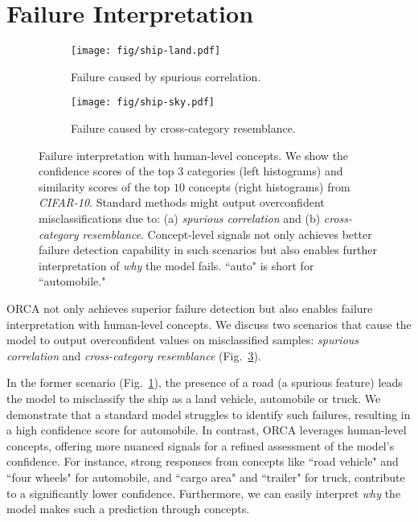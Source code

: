 \section{Failure Interpretation} \label{sec:interpretation}

\begin{figure}
    \centering
    \begin{subfigure}[b]{\linewidth}
         \centering
         \texttt{[image: fig/ship-land.pdf]}
         \caption{Failure caused by spurious correlation.}
         \label{viz:ship-land}
         \vspace{0.2cm}
     \end{subfigure}
    
     \begin{subfigure}[b]{\linewidth}
         \centering
         \texttt{[image: fig/ship-sky.pdf]}
         \caption{Failure caused by cross-category resemblance.}
         \label{viz:ship-sky}
     \end{subfigure}
    \caption{Failure interpretation with human-level concepts. We show the confidence scores of the top $3$ categories (left histograms) and similarity scores of the top $10$ concepts (right histograms) from \textit{CIFAR-10}. Standard methods might output overconfident misclassifications due to: (a) \textit{spurious correlation} and (b) \textit{cross-category resemblance}. Concept-level signals not only achieves better failure detection capability in such scenarios but also enables further interpretation of \textit{why} the model fails. ``auto" is short for ``automobile."}
    \label{fig:visual}
\end{figure}

ORCA not only achieves superior failure detection but also enables failure interpretation with human-level concepts.
We discuss two scenarios that cause the model to output overconfident values on misclassified samples: \textit{spurious correlation} and \textit{cross-category resemblance} (Fig.~\ref{fig:visual}). 

In the former scenario (Fig.~\ref{viz:ship-land}), the presence of a road (a spurious feature) leads the model to misclassify the ship as a land vehicle, automobile or truck. 
We demonstrate that a standard model struggles to identify such failures, resulting in a high confidence score for automobile. 
In contrast, ORCA leverages human-level concepts, offering more nuanced signals for a refined assessment of the model's confidence. 
For instance, strong responses from concepts like ``road vehicle" and ``four wheels" for automobile, and ``cargo area" and ``trailer" for truck, contribute to a significantly lower confidence. 
Furthermore, we can easily interpret \textit{why} the model makes such a prediction through concepts.


